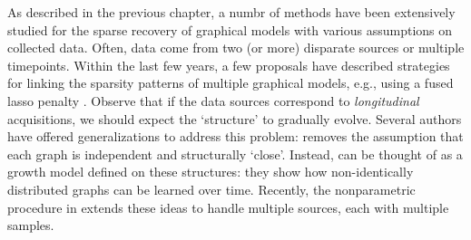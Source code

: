 As described in the previous chapter, a numbr of methods have been extensively studied for 
the sparse recovery of graphical models
with various assumptions on collected data.
Often, data come from two (or more) disparate sources or multiple timepoints.
Within the last few years, a few proposals have 
described strategies for linking the sparsity patterns of multiple graphical models, e.g., using a fused lasso 
penalty \citep{danaher2014joint,yang2015fused}. Observe that 
if the data sources correspond to {\em longitudinal} acquisitions, we should expect 
the `structure' to gradually evolve.
Several authors have offered generalizations to address this problem: \cite{zhou2010time} removes the assumption
that each graph is independent and structurally `close'.
Instead, \cite{zhou2010time} can be thought of as a growth model \citep{mcardle2000introduction} defined on these structures: they show how non-identically distributed graphs can be learned over time. 
Recently, the nonparametric procedure in \cite{qiu2015joint} extends these ideas
to handle multiple sources, each with multiple samples.

